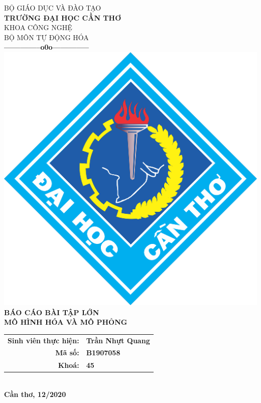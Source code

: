 \documentclass{standalone}
\begin{document}
\begin{titlepage}
\begin{center}
	{BỘ GIÁO DỤC VÀ ĐÀO TẠO}\\
	\textbf{TRƯỜNG ĐẠI HỌC CẦN THƠ}\\
	{KHOA CÔNG NGHỆ}\\
	{BỘ MÔN TỰ ĐỘNG HÓA}\\
	\textbf{--------------o0o--------------}\\[1.5cm]
	\includegraphics[scale=.15]{images/ctu-logo}\\[3.5cm]
	
	{\large \bf BÁO CÁO BÀI TẬP LỚN}\\[0.5cm]
	{\LARGE \textbf{MÔ HÌNH HÓA VÀ MÔ PHỎNG}}\\[2cm]
	

	\begin{tabular}{ r l }
	\textbf{Sinh viên thực hiện:} & \textbf{Trần Nhựt Quang}\\ 
	\textbf{Mã số:} & \textbf{B1907058}\\  
	\textbf{Khoá:} & \textbf{45}   
	\end{tabular}\\[3cm]
	\textbf{Cần thơ, 12/2020}
\end{center}
\end{titlepage}
\end{document}
